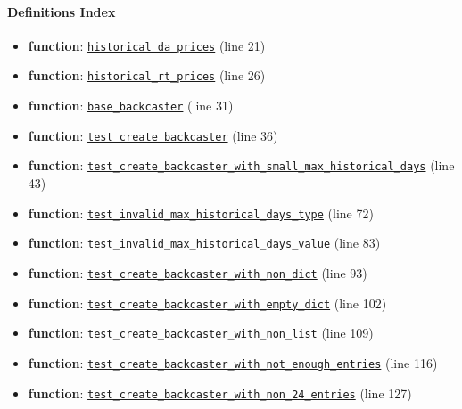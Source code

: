 \documentclass[11pt]{report}
\begin{document}
\paragraph{Definitions Index}
\begin{itemize}[leftmargin=*]
  \item \textbf{function}: \hyperref[def:tests-test_backcaster.py:historical_da_prices:L21]{\texttt{historical\_da\_prices}} (line 21)
  \item \textbf{function}: \hyperref[def:tests-test_backcaster.py:historical_rt_prices:L26]{\texttt{historical\_rt\_prices}} (line 26)
  \item \textbf{function}: \hyperref[def:tests-test_backcaster.py:base_backcaster:L31]{\texttt{base\_backcaster}} (line 31)
  \item \textbf{function}: \hyperref[def:tests-test_backcaster.py:test_create_backcaster:L36]{\texttt{test\_create\_backcaster}} (line 36)
  \item \textbf{function}: \hyperref[def:tests-test_backcaster.py:test_create_backcaster_with_small_max_historical_days:L43]{\texttt{test\_create\_backcaster\_with\_small\_max\_historical\_days}} (line 43)
  \item \textbf{function}: \hyperref[def:tests-test_backcaster.py:test_invalid_max_historical_days_type:L72]{\texttt{test\_invalid\_max\_historical\_days\_type}} (line 72)
  \item \textbf{function}: \hyperref[def:tests-test_backcaster.py:test_invalid_max_historical_days_value:L83]{\texttt{test\_invalid\_max\_historical\_days\_value}} (line 83)
  \item \textbf{function}: \hyperref[def:tests-test_backcaster.py:test_create_backcaster_with_non_dict:L93]{\texttt{test\_create\_backcaster\_with\_non\_dict}} (line 93)
  \item \textbf{function}: \hyperref[def:tests-test_backcaster.py:test_create_backcaster_with_empty_dict:L102]{\texttt{test\_create\_backcaster\_with\_empty\_dict}} (line 102)
  \item \textbf{function}: \hyperref[def:tests-test_backcaster.py:test_create_backcaster_with_non_list:L109]{\texttt{test\_create\_backcaster\_with\_non\_list}} (line 109)
  \item \textbf{function}: \hyperref[def:tests-test_backcaster.py:test_create_backcaster_with_not_enough_entries:L116]{\texttt{test\_create\_backcaster\_with\_not\_enough\_entries}} (line 116)
  \item \textbf{function}: \hyperref[def:tests-test_backcaster.py:test_create_backcaster_with_non_24_entries:L127]{\texttt{test\_create\_backcaster\_with\_non\_24\_entries}} (line 127)

\end{itemize}
\end{document}
